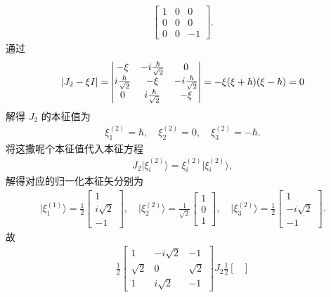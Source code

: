 \documentclass{assignment}
\begin{document}
\begin{pf}
\begin{align}
\begin{bmatrix}
            1&0&0\\
            0&0&0\\
            0&0&-1
        \end{bmatrix}.
    \end{align}
    通过
    \begin{align}
        \left\lvert J_2-\xi I\right\rvert=\begin{vmatrix}
            -\xi&-i\frac{\hbar}{\sqrt{2}}&0\\
            i\frac{\hbar}{\sqrt{2}}&-\xi&-i\frac{\hbar}{\sqrt{2}}\\
            0&i\frac{\hbar}{\sqrt{2}}&-\xi
        \end{vmatrix}=-\xi(\xi+\hbar)(\xi-\hbar)=0
    \end{align}
    解得 $J_2$ 的本征值为
    \begin{align}
        \xi_1^{(2)}=\hbar,\quad\xi_2^{(2)}=0,\quad\xi_3^{(2)}=-\hbar.
    \end{align}
    将这撒呢个本征值代入本征方程
    \begin{align}
        J_2\lvert\xi_i^{(2)}\rangle=\xi_i^{(2)}\lvert\xi_i^{(2)}\rangle,
    \end{align}
    解得对应的归一化本征矢分别为
    \begin{align}
        \lvert\xi_1^{(1)}\rangle=\frac{1}{2}\begin{bmatrix}
            1\\
            i\sqrt{2}\\
            -1
        \end{bmatrix},\quad\lvert\xi_2^{(2)}\rangle=\frac{1}{\sqrt{2}}\begin{bmatrix}
            1\\
            0\\
            1
        \end{bmatrix},\quad\lvert\xi_3^{(2)}\rangle=\frac{1}{2}\begin{bmatrix}
            1\\
            -i\sqrt{2}\\
            -1
        \end{bmatrix}.
    \end{align}
    故
    \begin{align}
        \frac{1}{2}\begin{bmatrix}
            1&-i\sqrt{2}&-1\\
            \sqrt{2}&0&\sqrt{2}\\
            1&i\sqrt{2}&-1
        \end{bmatrix}J_2\frac{1}{2}\begin{bmatrix}

\end{bmatrix}
\end{align}
\end{pf}
\end{document}
